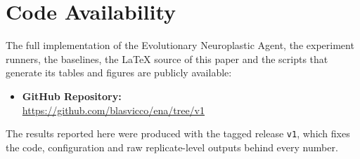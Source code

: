 \section*{Code Availability}

The full implementation of the Evolutionary Neuroplastic Agent, the experiment runners, the baselines, the LaTeX source of this paper and the scripts that generate its tables and figures are publicly available:
\begin{itemize}
    \item \textbf{GitHub Repository:}\\ \url{https://github.com/blasvicco/ena/tree/v1}
\end{itemize}
The results reported here were produced with the tagged release \texttt{v1}, which fixes the code, configuration and raw replicate-level outputs behind every number.
